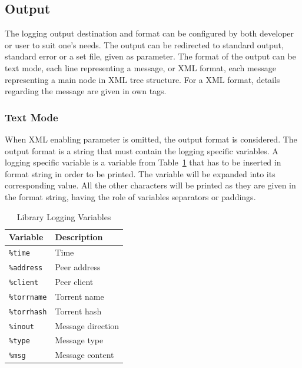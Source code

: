 \subsection{Output}

The logging output destination and format can be configured by both developer
or user to suit one's needs. The output can be redirected to standard output,
standard error or a set file, given as parameter. The format of the output can
be text mode, each line representing a message, or XML format, each message
representing a main node in XML tree structure. For a XML format, details
regarding the message are given in own tags.

\subsubsection{Text Mode}

When XML enabling parameter is omitted, the output format is considered. The
output format is a string that must contain the logging specific variables. A
logging specific variable is a variable from
Table~\ref{tab:proto-measure:liblog-variables} that has to be inserted in
format string in order to be printed. The variable will be expanded into its
corresponding value. All the other characters will be printed as they are
given in the format string, having the role of variables separators or
paddings.

\begin{table}[htb]
  \centering
  \caption{Library Logging Variables}
  \label{tab:proto-measure:liblog-variables}
  \begin{tabular}{@{}ll@{}}
    \toprule
      \textbf{Variable} & \textbf{Description} \\
    \midrule
      \texttt{\%time} & Time \\
      \texttt{\%address} & Peer address \\
      \texttt{\%client} & Peer client \\
      \texttt{\%torrname} & Torrent name \\
      \texttt{\%torrhash} & Torrent hash \\
      \texttt{\%inout} & Message direction \\
      \texttt{\%type} & Message type \\
      \texttt{\%msg} & Message content \\
    \bottomrule
  \end{tabular}
\end{table}


